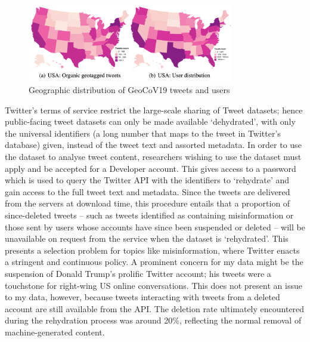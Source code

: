 \documentclass[12pt,a4]{article}
\begin{document}
\begin{figure}[h!]
    \includegraphics[width=0.8\textwidth]{figs/GeoCov-USdist.png}    
    \centering
    \caption{Geographic distribution of GeoCoV19 tweets and users \parencite{qaziGeoCoV19DatasetHundreds2020a}}
\end{figure}

Twitter's terms of service restrict the large-scale sharing of Tweet datasets; hence public-facing tweet datasets can only be made available `dehydrated', with only the universal identifiers (a long number that maps to the tweet in Twitter's database) given, instead of the tweet text and assorted metadata. In order to use the dataset to analyse tweet content, researchers wishing to use the dataset must apply and be accepted for a Developer account. This gives access to a password which is used to query the Twitter API with the identifiers to `rehydrate' and gain access to the full tweet text and metadata. Since the tweets are delivered from the servers at download time, this procedure entails that a proportion of since-deleted tweets -- such as tweets identified as containing misinformation or those sent by users whose accounts have since been suspended or deleted -- will be unavailable on request from the service when the dataset is `rehydrated'. This presents a selection problem for topics like misinformation, where Twitter enacts a stringent and continuous policy. A prominent concern for my data might be the suspension of Donald Trump's prolific Twitter account; his tweets were a touchstone for right-wing US online conversations. This does not present an issue to my data, however, because tweets interacting with tweets from a deleted account are still available from the API. The deletion rate ultimately encountered during the rehydration process was around 20\%, reflecting the normal removal of machine-generated content.
\end{document}
